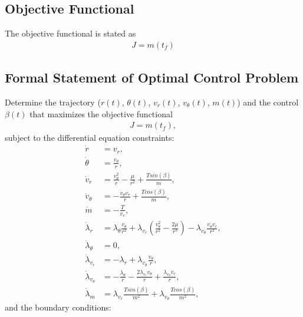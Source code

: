 \documentclass[]{article}
\begin{document}
\subsection{Objective Functional}
The objective functional is stated as
\begin{align}
	J = m(t_f)
\end{align}
\subsection{Formal Statement of Optimal Control Problem}
Determine the trajectory (\(r(t)\), \(\theta(t)\), \(v_r(t)\), \(v_\theta(t)\), \(m(t)\)) and the control \(\beta(t)\) that maximizes the objective functional
\begin{align*}
	J = m(t_f),
\end{align*}
subject to the differential equation constraints:
\begin{align*}
	\dot{r}        &= v_r, \\
	\dot{\theta}   &= \frac{v_\theta}{r}, \\
	\dot{v}_r      &= \frac{v^2_{\theta}}{r} - \frac{\mu}{r^2} + \frac{Tsin(\beta)}{m}, \\
    \dot{v}_\theta &= -\frac{v_{\theta}v_{r}}{r}   + \frac{Tcos(\beta)}{m}, \\
	\dot{m}        &= -\frac{T}{v_e}, \\
	\dot{\lambda}_r      &=\lambda_\theta\frac{v_\theta}{r^2} + \lambda_{v_r}(\frac{v_{\theta}^2}{r^2} - \frac{2\mu}{r^3}) - \lambda_{v_\theta}\frac{v_{\theta}v_r}{r^2},\\
    \dot{\lambda}_\theta &= 0,                                                                                                    \\
    \dot{\lambda}_{v_r}  &= -\lambda_r + \lambda_{v_\theta}\frac{v_\theta}{r},                                                    \\
    \dot{\lambda}_{v_\theta} &= -\frac{\lambda_\theta}{r} - \frac{2\lambda_{v_r}v_\theta}{r} + \frac{\lambda_{v_\theta}v_r}{r}, \\
    \dot{\lambda}_m          &= \lambda_{v_r}\frac{Tsin(\beta)}{m^2} + \lambda_{v_\theta}\frac{Tcos(\beta)}{m^2},                      	
\end{align*}
and the boundary conditions:                                                                                                                                                                
\end{document}
